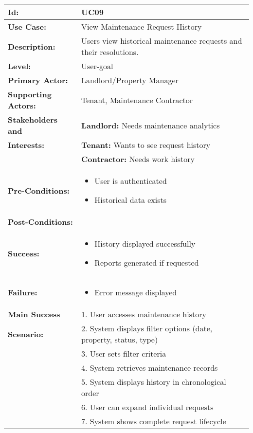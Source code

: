 \documentclass[12pt]{article}
\begin{document}
\begin{longtable}{|p{3cm}|p{11cm}|}
\hline
\textbf{Id:} & UC09 \\
\hline
\textbf{Use Case:} & View Maintenance Request History \\
\hline
\textbf{Description:} & Users view historical maintenance requests and their resolutions. \\
\hline
\textbf{Level:} & User-goal \\
\hline
\textbf{Primary Actor:} & Landlord/Property Manager \\
\hline
\textbf{Supporting Actors:} & Tenant, Maintenance Contractor \\
\hline
\textbf{Stakeholders and} & \textbf{Landlord:} Needs maintenance analytics \\
\textbf{Interests:} & \textbf{Tenant:} Wants to see request history \\
& \textbf{Contractor:} Needs work history \\
\hline
\textbf{Pre-Conditions:} & 
\begin{itemize}
    \item User is authenticated
    \item Historical data exists
\end{itemize} \\
\hline
\textbf{Post-Conditions:} & \\
\textbf{Success:} & 
\begin{itemize}
    \item History displayed successfully
    \item Reports generated if requested
\end{itemize} \\
\textbf{Failure:} & 
\begin{itemize}
    \item Error message displayed
\end{itemize} \\
\hline
\textbf{Main Success} & 1. User accesses maintenance history \\
\textbf{Scenario:} & 2. System displays filter options (date, property, status, type) \\
& 3. User sets filter criteria \\
& 4. System retrieves maintenance records \\
& 5. System displays history in chronological order \\
& 6. User can expand individual requests \\
& 7. System shows complete request lifecycle \\

\end{longtable}
\end{document}
